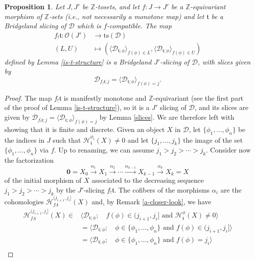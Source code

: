 \documentclass{article}
\newtheorem{prop}[thm]{Proposition}
\theoremstyle{definition}
\newcommand{\Z}{\mathbb{Z}}
\newcommand{\Oo}{\mathcal{O}}
\newcommand{\ts}{\mathrm{ts}}
\newcommand{\tee}{\mathfrak{t}}
\begin{document}
\begin{prop}
Let $J,J'$ be $\Z$-tosets, and let  $f\colon J\to J'$ be a $\Z$-equivariant morphism of $\Z$-sets (i.e., not necessarily a monotone map) and let $\tee$ be a Bridgeland slicing of $\mathscr{D}$ which is $f$-compatible.  The map
\begin{align*}
f_!\tee\colon \Oo(J')&\to\ts(\mathscr{D})\\
(L,U)&\mapsto (\langle \mathscr{D}_{\tee;\phi}\rangle_{f(\phi)\in L},\langle \mathscr{D}_{\tee;\phi}\rangle_{f(\phi)\in U})
\end{align*}
defined by Lemma \ref{is-t-structure} is a Bridgeland $J'$-slicing of $\mathscr{D}$, with slices given by
\[
\mathscr{D}_{f_!\tee;j}=\langle \mathscr{D}_{\tee;\phi}\rangle_{f(\phi)=j}.
\]
\end{prop}
\begin{proof}
The map $f_!\tee$ is manifestly monotone and $\Z$-equivariant (see the first part of the proof of Lemma \ref{is-t-structure}), so it is a $J'$ slicing of $\mathscr{D}$, and its slices are given by $\mathscr{D}_{f_!\tee;j}=
\langle \mathscr{D}_{\tee;\phi}\rangle_{f(\phi)=j}$ by Lemma \ref{slices}. We are therefore left with showing that it is finite and discrete. Given an object $X$ in $\mathscr{D}$, let  $\{\phi_1,\dots,\phi_n\}$ be the indices in $J$ such that $\mathcal{H}^{\phi_i}_\tee(X)\neq 0$ and let $\{j_1,\dots,j_k\}$ the image of the set $\{\phi_1,\dots,\phi_n\}$ via $f$. Up to renaming, we can assume $j_1>j_{2}>\cdots>j_k$. Consider now the factorization
\[
\mathbf{0}=X_0 \xrightarrow{\alpha_1} X_1\xrightarrow{\alpha_2}\cdots \xrightarrow{\alpha_{k-1}}X_{k-1}\xrightarrow{\alpha_k} X_k=X
\]
of the initial morphism of $X$ associated to the decreasing sequence $j_1>j_2>\cdots>j_k$ by the $J'$-slicing $f_!\tee$. The cofibers of the morphisms $\alpha_{i}$ are the cohomologies
$\mathcal{H}^{(j_{i+1},j_{i}]}_{f_!\tee}(X)$ and, by Remark \ref{a-closer-look}, we have
\begin{align*}
\mathcal{H}^{(j_{i+1},j_{i}]}_{f_!\tee}(X)\in& \langle \mathscr{D}_{\tee;\phi};\quad f(\phi)\in (j_{i+1},j_{i}] \text{ and }\mathcal{H}^\phi_\tee(X)\neq 0\rangle\\
&=\langle \mathscr{D}_{\tee;\phi};\quad \phi\in\{\phi_1,\dots,\phi_n\}\text{ and } f(\phi)\in(j_{i+1},j_{i}]\rangle\\
&=\langle \mathscr{D}_{\tee;\phi};\quad \phi\in\{\phi_1,\dots,\phi_n\}\text{ and } f(\phi)=j_{i}\rangle\\

\end{align*}
\end{proof}
\end{document}
